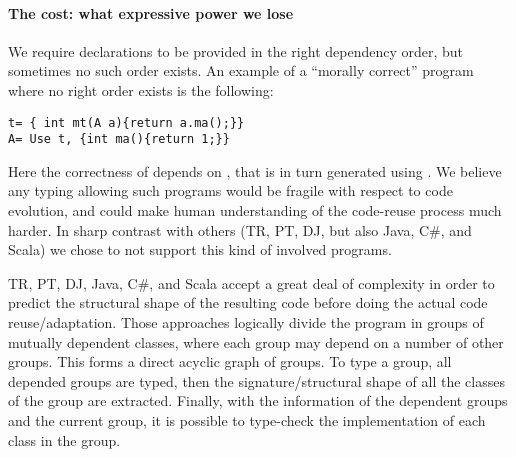 \paragraph{The cost: what expressive power we lose}
We require declarations to be provided in the right dependency order, but sometimes no such order exists.
An example of a ``morally correct'' program where no right order exists is the following:
\begin{lstlisting}
t= { int mt(A a){return a.ma();}}
A= Use t, {int ma(){return 1;}}
\end{lstlisting}
Here the correctness of \Q@t@ depends on 
\Q@A@, that is in turn generated using \Q@t@.
We believe any typing allowing such programs would be fragile with respect to code evolution,
and could make human understanding of the code-reuse process much harder.
%
%
In sharp contrast with others (TR, PT, DJ, but also Java, C\#, and Scala)
we chose to not support this kind of involved programs.

TR, PT, DJ, Java, C\#, and Scala
accept a great deal of complexity in order to predict the structural shape of the resulting code before doing the actual code reuse/adaptation.
Those approaches logically divide the program in groups of mutually dependent classes, where each group may depend on a number of other groups.
This forms a direct acyclic graph of groups.
To type a group, all depended groups are typed, then
the signature/structural shape of all
the classes of the group are extracted.
Finally, with the information of the dependent groups and the current group, it is possible to type-check the implementation of each class in the group.




